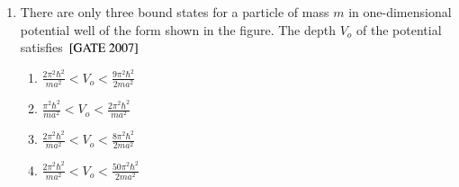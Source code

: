 \documentclass[journal]{IEEEtran}
\begin{document}
\begin{enumerate}
\begin{multicols}{4}
\begin{enumerate}
\end{enumerate}
\end{multicols}
\item There are only three bound states for a particle of mass $m$ in one-dimensional potential well of the form shown in the figure. The depth $V_o$ of the potential satisfies 
\hfill{${}\left[\text{GATE 2007}\right]$} 
\begin{multicols}{2}
\begin{enumerate}
    \item $\frac{2\pi^2\hbar^2}{ma^2}<V_o< \frac{9\pi^2\hbar^2}{2ma^2} $
     \item $\frac{\pi^2\hbar^2}{ma^2}<V_o< \frac{2\pi^2\hbar^2}{ma^2} $
      \item $\frac{2\pi^2\hbar^2}{ma^2}<V_o< \frac{8\pi^2\hbar^2}{2ma^2} $
       \item $\frac{2\pi^2\hbar^2}{ma^2}<V_o< \frac{50\pi^2\hbar^2}{2ma^2} $ 
       

\end{enumerate}
\end{multicols}
\end{enumerate}
\end{document}
